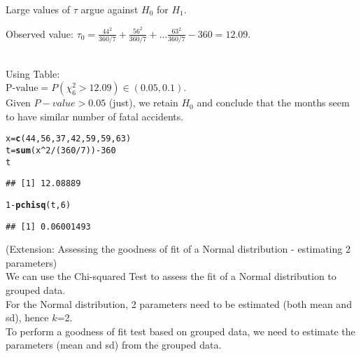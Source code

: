 \documentclass[bigtut]{tutorial}\usepackage[]{graphicx}\usepackage[]{color}
\makeatletter
\newcommand{\hlnum}[1]{\textcolor[rgb]{0.686,0.059,0.569}{#1}}%
\newcommand{\hlopt}[1]{\textcolor[rgb]{0,0,0}{#1}}%
\newcommand{\hlstd}[1]{\textcolor[rgb]{0.345,0.345,0.345}{#1}}%
\newcommand{\hlkwb}[1]{\textcolor[rgb]{0.69,0.353,0.396}{#1}}%
\newcommand{\hlkwd}[1]{\textcolor[rgb]{0.737,0.353,0.396}{\textbf{#1}}}%
\newenvironment{kframe}{%
 \def\at@end@of@kframe{}%
 \ifinner\ifhmode%
  \def\at@end@of@kframe{\end{minipage}}%
  \begin{minipage}{\columnwidth}%
 \fi\fi%
 \def\FrameCommand##1{\hskip\@totalleftmargin \hskip-\fboxsep
 \colorbox{shadecolor}{##1}\hskip-\fboxsep
     \hskip-\linewidth \hskip-\@totalleftmargin \hskip\columnwidth}%
 \MakeFramed {\advance\hsize-\width
   \@totalleftmargin\z@ \linewidth\hsize
   \@setminipage}}%
 {\par\unskip\endMakeFramed%
 \at@end@of@kframe}
\newenvironment{knitrout}{}{} %
\makeatother
\begin{document}
\begin{tutorial}
\begin{questions}
\begin{solution}
Large values of $\tau$ argue against $H_{0}$ for $H_{1}$.

Observed value: $\tau_{0} = 
\frac{44^2}{360/7} + \frac{56^2}{360/7} + \ldots \frac{63^2}{360/7} - 360 = 12.09$.

  \\

Using Table: \\
$\text{P-value} =  P(\chi^2_{6} > 12.09) \in(0.05,0.1)$. \\

Given $P-value > 0.05$ (just), we retain $H_{0}$ and conclude that the months seem to have similar number of fatal accidents.

\begin{knitrout}
\color{fgcolor}\begin{kframe}
\begin{alltt}
\hlstd{x}\hlkwb{=}\hlkwd{c}\hlstd{(}\hlnum{44}\hlstd{,}\hlnum{56}\hlstd{,}\hlnum{37}\hlstd{,}\hlnum{42}\hlstd{,}\hlnum{59}\hlstd{,}\hlnum{59}\hlstd{,}\hlnum{63}\hlstd{)}
\hlstd{t} \hlkwb{=} \hlkwd{sum}\hlstd{(x}\hlopt{^}\hlnum{2}\hlopt{/}\hlstd{(}\hlnum{360}\hlopt{/}\hlnum{7}\hlstd{))}\hlopt{-}\hlnum{360}
\hlstd{t}
\end{alltt}
\begin{verbatim}
## [1] 12.08889
\end{verbatim}
\begin{alltt}
\hlnum{1}\hlopt{-}\hlkwd{pchisq}\hlstd{(t,}\hlnum{6}\hlstd{)}
\end{alltt}
\begin{verbatim}
## [1] 0.06001493
\end{verbatim}
\end{kframe}
\end{knitrout}
\end{solution}






\question (Extension: Assessing the goodness of fit of a Normal distribution - estimating 2 parameters) \\

We can use the Chi-squared Test to assess the fit of a Normal distribution to grouped data. \\
For the Normal distribution, 2 parameters need to be estimated (both mean and sd), hence $k$=2. \\
To perform a goodness of fit test based on grouped data, we need to estimate the parameters (mean and sd) from the grouped data. \\


\end{questions}
\end{tutorial}
\end{document}
